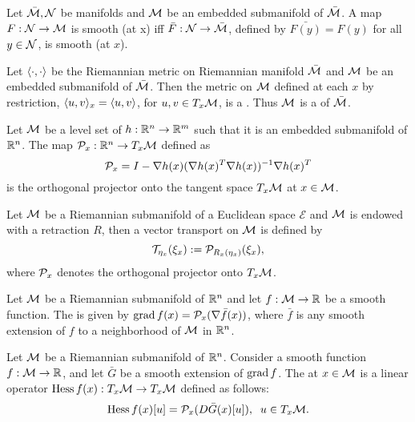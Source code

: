 \documentclass[11pt,a4paper]{article}
\begin{document}
\begin{prop}
Let $\bar{\mathcal{M}}, \mathcal{N}$ be manifolds and $\mathcal{M}$ be an embedded submanifold of $\bar{\mathcal{M}}$. A map $F:\mathcal{N}\rightarrow \mathcal{M}$ is smooth (at x) iff $\bar{F}:\mathcal{N}\rightarrow \bar{\mathcal{M}}$, defined by $\bar{F(y)} = F(y)$ for all $y\in \mathcal{N}$, is smooth (at $x$).
\end{prop}

\begin{prop}
Let $\langle \cdot, \cdot \rangle$ be the Riemannian metric on Riemannian manifold $\bar{\mathcal{M}}$ and $\mathcal{M}$ be an embedded submanifold of $\bar{\mathcal{M}}$. Then the metric on $\mathcal{M}$ defined at each $x$ by restriction, $\langle u, v \rangle_x = \langle u, v \rangle$, for $u, v \in T_x\mathcal{M}$, is a . Thus $\mathcal{M}$ is a  of $\bar{\mathcal{M}}$.
\end{prop}

\begin{prop}
Let $\mathcal{M}$ be a level set of $h:\mathbb{R}^n\rightarrow \mathbb{R}^m$ such that it is an embedded submanifold of $\mathbb{R}^n$. The map $\mathcal{P}_x:\mathbb{R}^n\rightarrow T_x\mathcal{M}$ defined as 
\begin{equation*}
\mathcal{P}_x = I - \nabla h(x)(\nabla h(x)^T\nabla h(x))^{-1}\nabla h(x)^T    
\end{equation*}
is the orthogonal projector onto the tangent space $T_x\mathcal{M}$ at $x\in \mathcal{M}$.
\end{prop}

\begin{prop}
Let $\mathcal{M}$ be a Riemannian submanifold of a Euclidean space $\mathcal{E}$ and $\mathcal{M}$ is endowed with a retraction $R$, then a vector transport on $\mathcal{M}$ is defined by 
\begin{equation}
\mathcal{T}_{\eta_x}(\xi_x) := \mathcal{P}_{R_x(\eta_x)}(\xi_x),
\end{equation}
where $\mathcal{P}_x$ denotes the orthogonal projector onto $T_x\mathcal{M}$.
\end{prop}

\begin{prop}
Let $\mathcal{M}$ be a Riemannian submanifold of $\mathbb{R}^n$ and let $f:\mathcal{M}\rightarrow \mathbb{R}$ be a smooth function. The  is given by $\text{grad}\, f(x) = \mathcal{P}_x(\nabla \bar{f}(x))$, where $\bar{f}$ is any smooth extension of $f$ to a neighborhood of $\mathcal{M}$ in $\mathbb{R}^n$.
\end{prop}

\begin{prop}
Let $\mathcal{M}$ be a Riemannian submanifold of $\mathbb{R}^n$. Consider a smooth function $f:\mathcal{M}\rightarrow \mathbb{R}$, and let $\bar{G}$ be a smooth extension of $\text{grad}\, f$. The  at $x \in\mathcal{M}$ is a linear operator $\text{Hess}\, f(x):T_x\mathcal{M}\rightarrow T_x\mathcal{M}$ defined as follows:
\begin{equation*}
\text{Hess}\, f(x)[u] = \mathcal{P}_x(D\bar{G}(x)[u]), \;\;u\in T_x\mathcal{M}.
\end{equation*}
\end{prop}
\end{document}
